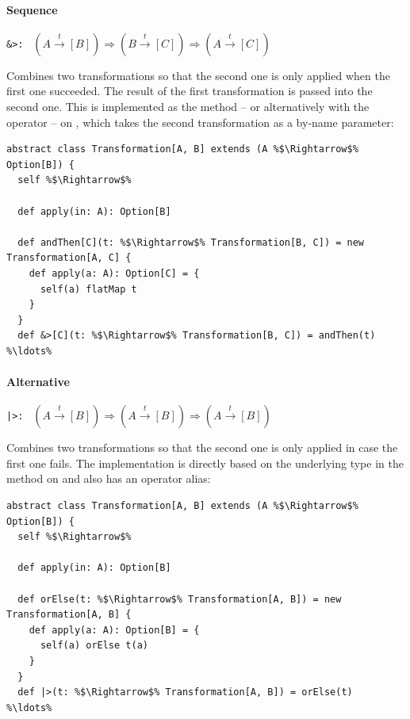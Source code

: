 \paragraph{Sequence} \hfill \lstinline{&>: } $(A \overset{t}{\rightarrow} [B]) \Rightarrow (B \overset{t}{\rightarrow} [C]) \Rightarrow (A \overset{t}{\rightarrow} [C])$

\vspace{7pt} Combines two transformations so that the second one is only applied when the first one succeeded. The result of the first transformation is passed into the second one. This is implemented as the  method -- or alternatively with the \src{\&>} operator -- on , which takes the second transformation as a by-name parameter:

\begin{lstlisting}
abstract class Transformation[A, B] extends (A %$\Rightarrow$% Option[B]) {
  self %$\Rightarrow$%

  def apply(in: A): Option[B]

  def andThen[C](t: %$\Rightarrow$% Transformation[B, C]) = new Transformation[A, C] {
    def apply(a: A): Option[C] = {
      self(a) flatMap t
    }
  }
  def &>[C](t: %$\Rightarrow$% Transformation[B, C]) = andThen(t)
%\ldots%
\end{lstlisting}


\paragraph{Alternative} \hfill \lstinline{|>: } $(A \overset{t}{\rightarrow} [B]) \Rightarrow (A \overset{t}{\rightarrow} [B]) \Rightarrow (A \overset{t}{\rightarrow} [B])$

\vspace{7pt} Combines two transformations so that the second one is only applied in case the first one fails. The implementation is directly based on the underlying  type in the  method on  and also has an operator alias:

\begin{lstlisting}
abstract class Transformation[A, B] extends (A %$\Rightarrow$% Option[B]) {
  self %$\Rightarrow$%

  def apply(in: A): Option[B]

  def orElse(t: %$\Rightarrow$% Transformation[A, B]) = new Transformation[A, B] {
    def apply(a: A): Option[B] = {
      self(a) orElse t(a)
    }
  }
  def |>(t: %$\Rightarrow$% Transformation[A, B]) = orElse(t)
%\ldots%
\end{lstlisting}

